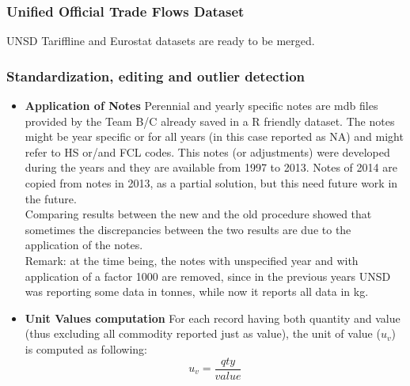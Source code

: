 \documentclass[nojss]{jss}\usepackage[]{graphicx}\usepackage[]{color}
\begin{document}
\subsubsection{Unified Official Trade Flows Dataset}
UNSD Tariffline and Eurostat datasets are ready to be merged.

\subsubsection{Standardization, editing and outlier detection}
\begin{itemize}
\item {\bf Application of Notes} Perennial and yearly specific notes are mdb files provided by the Team B/C already saved in a R friendly dataset. The notes might be year specific or for all years (in this case reported as NA) and might refer to HS or/and FCL codes. This notes (or adjustments) were developed during the years and they are available from 1997 to 2013. Notes of 2014 are copied from notes in 2013, as a partial solution, but this need future work in the future.\\
Comparing results between the new and the old procedure showed that sometimes the discrepancies between the two results are due to the application of the notes.\\
Remark: at the time being, the notes with unspecified year and with application of a factor 1000 are removed, since in the previous years UNSD was reporting some data in tonnes, while now it reports all data in kg.\\

\item {\bf Unit Values computation} For each record having both quantity and value (thus excluding all commodity reported just as value), the unit of value ($u_v$) is computed as following:
\begin{equation}
u_v = \frac{qty}{value}
\end{equation}


\end{itemize}
\end{document}
